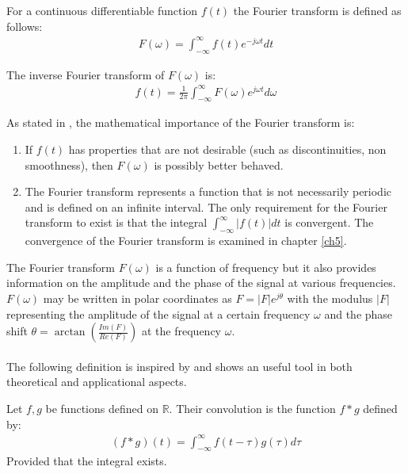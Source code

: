 \begin{definition} \label{def:Fourier_trans}
For a continuous differentiable function $f(t)$ the Fourier transform is defined as follows:
\begin{align*}
F(\omega) = \int_{-\infty}^\infty f(t) e^{-j \omega t} dt
\end{align*}
\end{definition}

\begin{definition} \label{def:InverseFourier_trans}
The inverse Fourier transform of $F(\omega)$ is:
\begin{align*}
f(t) = \frac{1}{2\pi} \int_{-\infty}^\infty F(\omega) e^{j \omega t} d\omega
\end{align*}
\end{definition}

\noindent
As stated in \cite{FourierTrans}, the mathematical importance of the Fourier transform is:
\begin{enumerate}
\item If $f(t)$ has properties that are not desirable (such as discontinuities, non smoothness), then $F(\omega)$ is possibly better behaved.
\item The Fourier transform represents a function that is not necessarily periodic and is defined on an infinite interval. The only requirement for the Fourier transform to exist is that the integral $\int_{-\infty}^\infty |f(t)| dt$ is convergent. The convergence of the Fourier transform is examined in chapter \ref{ch5}.
\end{enumerate}

\noindent
The Fourier transform $F(\omega)$ is a function of frequency but it also provides information on the amplitude and the phase of the signal at various frequencies. $F(\omega)$ may be written in polar coordinates as $F = |F|e^{j\theta}$ with the modulus $|F|$ representing the amplitude of the signal at a certain frequency $\omega$ and the phase shift $\theta = \arctan \left(\frac{Im(F)}{Re(F)} \right)$ at the frequency $\omega$.
\\ \\
The following definition is inspired by \cite{page 206, FAA} and shows an useful tool in both theoretical and applicational aspects.
\begin{definition} \label{def:Convol}
Let $f,g$ be functions defined on $\mathbb{R}$. Their convolution is the function $f*g$ defined by:
\begin{align*}
(f*g)(t) = \int_{-\infty}^\infty f(t-\tau) g(\tau) d\tau
\end{align*}
Provided that the integral exists.
\end{definition}

